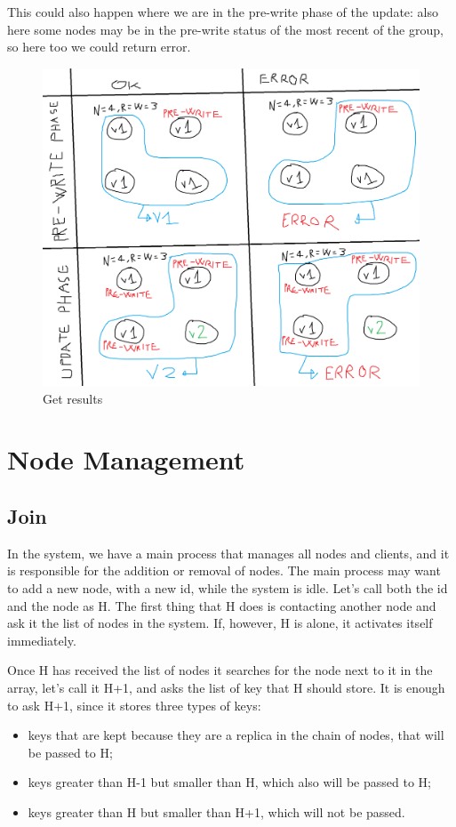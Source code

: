 \documentclass[12pt, a4paper]{article}
\begin{document}
    This could also happen where we are in the pre-write phase of the update: also here some nodes may be in the pre-write status of the most recent of the group, so here too we could return error. 
    
    \begin{figure}[H]
        \centering
        \includegraphics[width=\columnwidth]{get op.png}
        \caption{Get results}
    \end{figure}

    \pagebreak
    \section{Node Management}
    \subsection{Join}
    In the system, we have a main process that manages all nodes and clients, and it is responsible for the addition or removal of nodes. The main process may want to add a new node, with a new id, while the system is idle. Let's call both the id and the node as H. The first thing that H does is contacting another node and ask it the list of nodes in the system. If, however, H is alone, it activates itself immediately.

    Once H has received the list of nodes it searches for the node next to it in the array, let's call it H+1, and asks the list of key that H should store. It is enough to ask H+1, since it stores three types of keys: 
    \begin{itemize}
        \item keys that are kept because they are a replica in the chain of nodes, that will be passed to H; 
        \item keys greater than H-1 but smaller than H, which also will be passed to H;
        \item keys greater than H but smaller than H+1, which will not be passed.
    \end{itemize}
\end{document}

